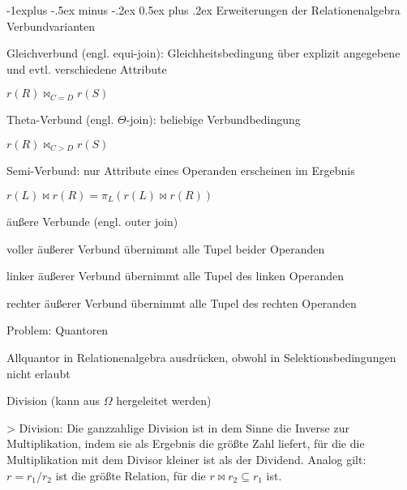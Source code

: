 \documentclass[a4paper]{article}
\makeatletter
\renewcommand{\subsection}{\@startsection{subsection}{2}{0mm}%
                                {-1explus -.5ex minus -.2ex}%
                                {0.5ex plus .2ex}%
                                {\normalfont\normalsize\bfseries}}
\makeatother
\begin{document}
\begin{multicols}{3}
    \subsection{Erweiterungen der Relationenalgebra}
    Verbundvarianten
    \begin{itemize*}
        \item Gleichverbund (engl. equi-join): Gleichheitsbedingung über explizit angegebene und evtl. verschiedene Attribute
        \begin{itemize*}
            \item $r(R) \bowtie_{C=D} r(S)$
        \end{itemize*}
        \item Theta-Verbund (engl. $\Theta$-join): beliebige Verbundbedingung
        \begin{itemize*}
            \item $r(R) \bowtie_{C>D} r(S)$
        \end{itemize*}
        \item Semi-Verbund: nur Attribute eines Operanden erscheinen im Ergebnis
        \begin{itemize*}
            \item $r(L) \bowtie r(R) = \pi_L (r(L) \bowtie r(R))$
        \end{itemize*}
        \item äußere Verbunde (engl. outer join)
        \begin{itemize*}
            \item voller äußerer Verbund übernimmt alle Tupel beider Operanden
            \item linker äußerer Verbund übernimmt alle Tupel des linken Operanden
            \item rechter äußerer Verbund übernimmt alle Tupel des rechten Operanden
        \end{itemize*}
    \end{itemize*}

    Problem: Quantoren
    \begin{itemize*}
        \item Allquantor in Relationenalgebra ausdrücken, obwohl in Selektionsbedingungen nicht erlaubt
        \item Division (kann aus $\Omega$ hergeleitet werden)
    \end{itemize*}

    > Division: Die ganzzahlige Division ist in dem Sinne die Inverse zur Multiplikation, indem sie als Ergebnis die größte Zahl liefert, für die die Multiplikation mit dem Divisor kleiner ist als der Dividend.
    Analog gilt: $r = r_1 / r_2$ ist die größte Relation, für die $r \bowtie r_2 \subseteq r_1$ ist.


\end{multicols}
\end{document}
